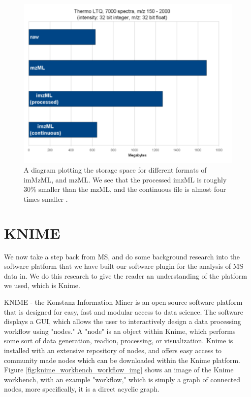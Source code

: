 \documentclass[11pt,openany]{book}
\begin{document}
\begin{figure}[H]
    \centering
    \includegraphics[scale=0.3]{./images/imzml_file_efficiency.png}
    \caption{A diagram plotting the storage space for different formats of imMzML, and mzML. We see that the processed imzML is roughly 30\% smaller than the mzML, and the continuous file is almost four times smaller \cite{imzml.org}.}
    \label{fig:imzML_mzML_efficiency_comparison}
\end{figure}

\section{KNIME}
We now take a step back from MS, and do some background research into the software platform that we have built our software plugin for the analysis of MS data in. We do this research to give the reader an understanding of the platform we used, which is Knime. 

KNIME - the Konstanz Information Miner is an open source software platform that is designed for easy, fast and modular access to data science. The software displays a GUI, which allows the user to interactively design a data processing workflow using "nodes." A "node" is an object within Knime, which performs some sort of data generation, readion, processing, or visualization. Knime is installed with an extensive repository of nodes, and offers easy access to community made nodes which can be downloaded within the Knime platform. Figure \ref{fig:knime_workbench_workflow_img} shows an image of the Knime workbench, with an example "workflow," which is simply a graph of connected nodes, more specifically, it is a direct acyclic graph. 
\end{document}
